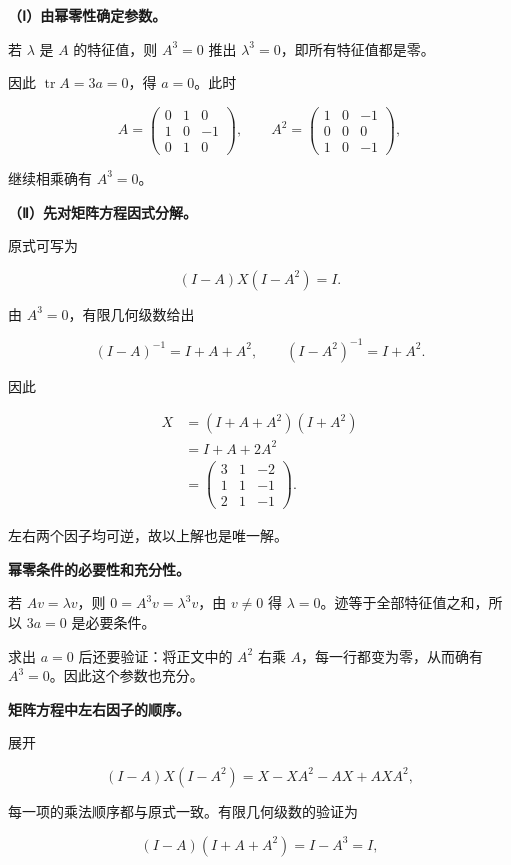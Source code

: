 \documentclass[UTF8,11pt,fontset=windows]{ctexart}
\begin{document}
\textbf{（Ⅰ）由幂零性确定参数。}

若 $\lambda$ 是 $A$ 的特征值，则 $A^3=0$ 推出 $\lambda^3=0$，即所有特征值都是零。

因此 $\operatorname{tr}A=3a=0$，得 $a=0$。此时

$$
A=\begin{pmatrix}0&1&0\\1&0&-1\\0&1&0\end{pmatrix},
\qquad A^2=\begin{pmatrix}1&0&-1\\0&0&0\\1&0&-1\end{pmatrix},
$$

继续相乘确有 $A^3=0$。

\textbf{（Ⅱ）先对矩阵方程因式分解。}

原式可写为

$$
(I-A)X(I-A^2)=I.
$$

由 $A^3=0$，有限几何级数给出

$$
(I-A)^{-1}=I+A+A^2,
\qquad (I-A^2)^{-1}=I+A^2.
$$

因此

$$
\begin{aligned}
X&=(I+A+A^2)(I+A^2)\\
&=I+A+2A^2\\
&=\begin{pmatrix}3&1&-2\\1&1&-1\\2&1&-1\end{pmatrix}.
\end{aligned}
$$

左右两个因子均可逆，故以上解也是唯一解。

\textbf{幂零条件的必要性和充分性。}

若 $Av=\lambda v$，则 $0=A^3v=\lambda^3v$，由 $v\ne0$ 得 $\lambda=0$。迹等于全部特征值之和，所以 $3a=0$ 是必要条件。

求出 $a=0$ 后还要验证：将正文中的 $A^2$ 右乘 $A$，每一行都变为零，从而确有 $A^3=0$。因此这个参数也充分。

\textbf{矩阵方程中左右因子的顺序。}

展开

$$
(I-A)X(I-A^2)
=X-XA^2-AX+AXA^2,
$$

每一项的乘法顺序都与原式一致。有限几何级数的验证为

$$
(I-A)(I+A+A^2)=I-A^3=I,
$$
\end{document}
